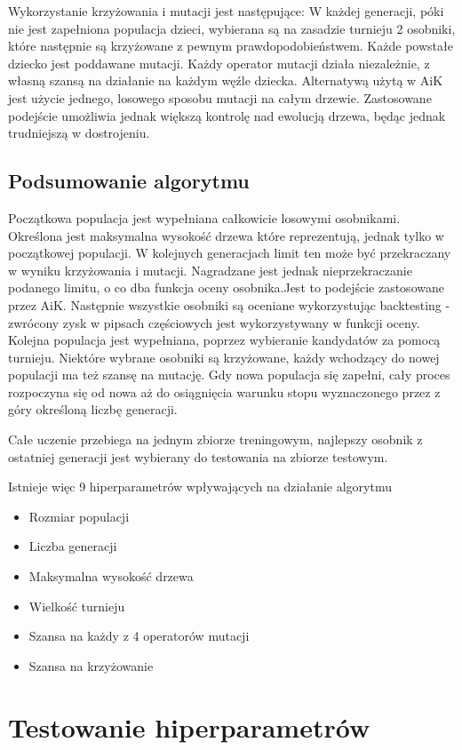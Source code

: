 \documentclass[twoside]{iisthesis}
\begin{document}
Wykorzystanie krzyżowania i mutacji jest następujące: W każdej generacji, póki nie jest zapełniona populacja dzieci, wybierana są na zasadzie turnieju 2 osobniki, które następnie są krzyżowane z pewnym prawdopodobieństwem. Każde powstałe  dziecko jest poddawane mutacji. Każdy operator mutacji działa niezależnie, z własną szansą na działanie na każdym węźle dziecka. Alternatywą użytą w AiK jest użycie jednego, losowego sposobu mutacji na całym drzewie. Zastosowane podejście umożliwia jednak większą kontrolę nad ewolucją drzewa, będąc jednak trudniejszą w dostrojeniu.

\section {Podsumowanie algorytmu}

Początkowa populacja jest wypełniana całkowicie losowymi osobnikami. Określona jest maksymalna wysokość drzewa które reprezentują, jednak tylko w początkowej populacji. W kolejnych generacjach limit ten może być przekraczany w wyniku krzyżowania i mutacji. Nagradzane jest jednak nieprzekraczanie podanego limitu, o co dba funkcja oceny osobnika.Jest to podejście zastosowane przez AiK. Następnie wszystkie osobniki są oceniane wykorzystując backtesting - zwrócony zysk w pipsach częściowych jest wykorzystywany w funkcji oceny. Kolejna populacja jest wypełniana, poprzez wybieranie kandydatów za pomocą turnieju. Niektóre wybrane osobniki są krzyżowane, każdy wchodzący do nowej populacji ma też szansę na mutację. Gdy nowa populacja się zapełni, cały proces rozpoczyna się od nowa aż do osiągnięcia warunku stopu wyznaczonego przez z góry określoną liczbę generacji.

Całe uczenie przebiega na jednym zbiorze treningowym, najlepszy osobnik z ostatniej generacji jest wybierany do testowania na zbiorze testowym. 

Istnieje więc 9 hiperparametrów wpływających na działanie algorytmu
\begin{itemize}
\item Rozmiar populacji
\item Liczba generacji
\item Maksymalna wysokość drzewa
\item Wielkość turnieju
\item Szansa na każdy z 4 operatorów mutacji
\item Szansa na krzyżowanie
\end{itemize}

\chapter {Testowanie hiperparametrów}
\end{document}
